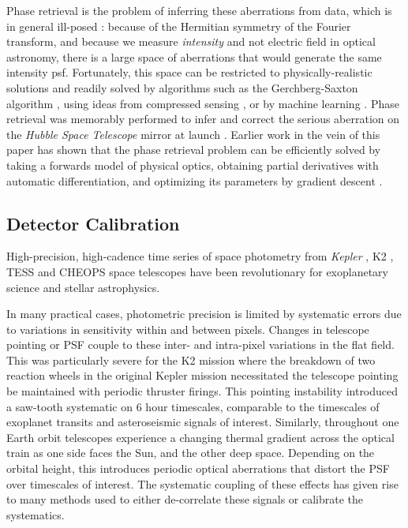 \documentclass[twocolumn]{spie}
\begin{document}
Phase retrieval is the problem of inferring these aberrations from data\cite{schechtman2014}, which is in general ill-posed \cite{barnett2020}: because of the Hermitian symmetry of the Fourier transform, and because we measure \textit{intensity} and not electric field in optical astronomy, there is a large space of aberrations that would generate the same intensity \ac{psf}. Fortunately, this space can be restricted to physically-realistic solutions and readily solved by algorithms such as the Gerchberg-Saxton algorithm \cite{gerchberg1972}, using ideas from compressed sensing \cite{candes2011}, or by machine learning \cite{metzler2018,isil2019,nishizaki2020}.  Phase retrieval was memorably performed to infer and correct the serious aberration on the \textit{Hubble Space Telescope} mirror at launch \cite{hubble_phase_ret}. 
Earlier work in the vein of this paper has shown that the phase retrieval problem can be efficiently solved by taking a forwards model of physical optics, obtaining partial derivatives with automatic differentiation, and optimizing its parameters by gradient descent \cite{jurling_fienup,phase_ret_and_design}.

\subsection{Detector Calibration}

High-precision, high-cadence time series of space photometry from \textit{Kepler} \cite{Borucki2010}, K2 \cite{K2}, TESS \cite{TESS} and CHEOPS \cite{CHEOPS} space telescopes have been revolutionary for exoplanetary science and stellar astrophysics. 

In many practical cases, photometric precision is limited by systematic errors due to variations in sensitivity within and between pixels. Changes in telescope pointing or PSF couple to these inter- and intra-pixel variations in the flat field. This was particularly severe for the K2 mission where the breakdown of two reaction wheels in the original Kepler mission necessitated the telescope pointing be maintained with periodic thruster firings. This pointing instability introduced a saw-tooth systematic on 6 hour timescales, comparable to the timescales of exoplanet transits and asteroseismic signals of interest. Similarly, throughout one Earth orbit telescopes experience a changing thermal gradient across the optical train as one side faces the Sun, and the other deep space. Depending on the orbital height, this introduces periodic optical aberrations that distort the PSF over timescales of interest. The systematic coupling of these effects has given rise to many methods used to either de-correlate these signals or calibrate the systematics. 
\end{document}
